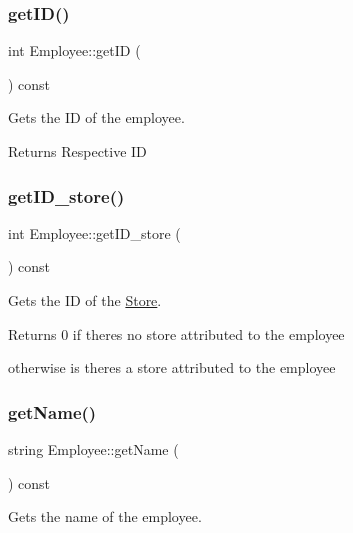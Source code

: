\subsubsection{\texorpdfstring{get\+I\+D()}{getID()}}
{\footnotesize\ttfamily int Employee\+::get\+ID (\begin{DoxyParamCaption}{ }\end{DoxyParamCaption}) const}



Gets the ID of the employee. 

\begin{DoxyReturn}{Returns}
Respective ID 
\end{DoxyReturn}
\mbox{\label{class_employee_a0a67622c70099242fb6742b860ff4db8}} 
\subsubsection{\texorpdfstring{get\+I\+D\+\_\+store()}{getID\_store()}}
{\footnotesize\ttfamily int Employee\+::get\+I\+D\+\_\+store (\begin{DoxyParamCaption}{ }\end{DoxyParamCaption}) const}



Gets the ID of the \hyperlink{class_store}{Store}. 

\begin{DoxyReturn}{Returns}
0 if there\textquotesingle{}s no store attributed to the employee 

otherwise is there\textquotesingle{}s a store attributed to the employee 
\end{DoxyReturn}
\mbox{\label{class_employee_a8e7c3870f6b4b08a5c7ccccd32ca8f37}} 
\subsubsection{\texorpdfstring{get\+Name()}{getName()}}
{\footnotesize\ttfamily string Employee\+::get\+Name (\begin{DoxyParamCaption}{ }\end{DoxyParamCaption}) const}



Gets the name of the employee. 

